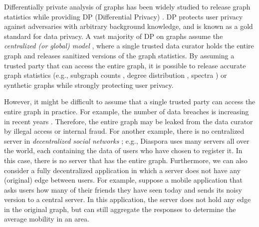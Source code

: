Differentially private analysis of graphs \cite{Raskhodnikova_Encyclopedia16} has been widely studied to release graph statistics while providing DP (Differential Privacy) \cite{DP,Dwork_ICALP06}. 
DP protects user privacy against adversaries with arbitrary background knowledge, and is known as a gold standard for data privacy. 
A vast majority of DP on graphs assume the \textit{centralized (or global) model} \cite{Blocki_FOCS12,Chen_PoPETs20,Day_SIGMOD16,Hay_ICDM09,Karwa_PVLDB11,Kasiviswanathan_TCC13,Nissim_STOC07,Raskhodnikova_arXiv15,Raskhodnikova_Encyclopedia16,Song_arXiv18,Wang_PAKDD13,Wang_TDP13}, where a single trusted data curator holds the entire graph and releases sanitized versions of the graph statistics. 
By assuming a trusted party that can access the entire graph, 
it is possible to release accurate graph statistics 
(e.g., subgraph counts \cite{Karwa_PVLDB11,Kasiviswanathan_TCC13,Song_arXiv18}, degree distribution \cite{Day_SIGMOD16,Hay_ICDM09,Raskhodnikova_arXiv15}, 
spectra 
\cite{Wang_PAKDD13}) 
or synthetic graphs \cite{Chen_PoPETs20,Wang_TDP13} 
while strongly protecting user privacy. 

However, 
it might be difficult to assume that a single trusted party can access the entire graph in practice. 
For example, the number of data breaches is increasing in recent years \cite{data_breach1,data_breach2}. 
Therefore, 
the entire graph may be leaked from the data curator by illegal access or internal fraud. 
For another example, there is no centralized server in \textit{decentralized social networks} \cite{Paul_CN14,Salve_CSR18}; e.g., Diaspora \cite{Diaspora} uses many servers all over the world, each containing the data of users who have chosen to register it. 
In this case, there is no server that has the entire graph. 
Furthermore, we can also consider a fully decentralized application in which a server does not have any (original) edge between users. 
For example, suppose a mobile application that asks users how many of their friends they have seen today and sends its noisy version to a central server. 
In this application, the server does not hold any edge in the original graph, 
but can still aggregate the responses to determine the average mobility in an area. 

